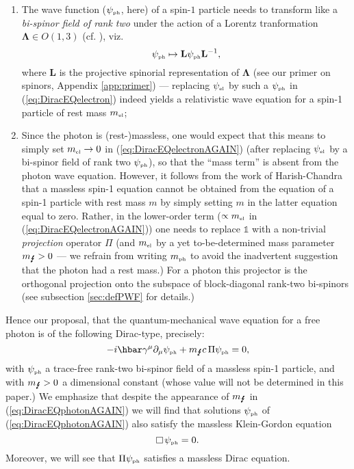 \documentclass[11pt]{article}
\theoremstyle{definition}
\newcommand{\refeq}[1]{(\ref{#1})}
\numberwithin{equation}{section}
\newcommand{\bL}{\mathbf{L}}
\newcommand{\beq}{\begin{equation}}
\newcommand{\eeq}{\end{equation}}
\newcommand{\Id}{\mathds{1}}
\newcommand{\bLa}{\boldsymbol{\Lambda}}
\newcommand{\psiPH}{{\psi_{\mbox{\rm\tiny ph}}}}
\newcommand{\psiEL}{{\psi_{\mbox{\rm\tiny el}}}}
\newcommand{\mEL}{{m_{\mbox{\rm\tiny el}}}}
\newcommand{\mPHO}{{m_{\mbox{\rm\tiny ph}}}}
\newcommand{\mPH}{{m_{\mbox{\Lightning}}}}
\newcommand{\ga}{\gamma}
\newcommand{\ben}{\begin{enumerate}}
\newcommand{\een}{\end{enumerate}}
\newcommand{\dal}{\raisebox{3pt}{\fbox{}}\,}
\begin{document}
\ben

\item 
{The wave function ($\psiPH$, here) of a spin-$1$ particle needs to transform like a {\em bi-spinor field of rank two}
under the action of a Lorentz tranformation $\bLa \in O(1,3)$ (cf. \cite{PenroseRindlerBOOK}), viz.
\beq 
\psiPH \mapsto \bL \psiPH \bL^{-1},
\eeq
where $\bL$ is the projective spinorial representation of $\bLa$ (see our primer on spinors, Appendix \ref{app:primer}) 
--- replacing $\psiEL$ by
such a $\psiPH$ in  \refeq{eq:DiracEQelectron} indeed yields a relativistic wave equation for a spin-1 particle of rest mass $\mEL$;}

\item
{Since the photon is (rest-)massless, one would expect that this means to simply set $\mEL\to 0$ 
in \refeq{eq:DiracEQelectronAGAIN} (after replacing $\psiEL$ by a {bi-spinor field of rank two} $\psiPH$),
so that the ``mass term'' is absent from the photon wave equation.
 However, it follows from the work of Harish-Chandra \cite{HC1946} that a massless spin-1 equation cannot be obtained 
from the equation of a  spin-1 particle with rest mass $m$ by simply setting $m$ in the latter equation equal to zero. 
 Rather, in the lower-order term ($\propto \mEL$ in \refeq{eq:DiracEQelectronAGAIN}) one
needs to replace $\Id$ with a non-trivial \emph{projection} operator $\Pi$ (and $\mEL$ by a yet to-be-determined mass parameter $\mPH>0$ ---
we refrain from writing $\mPHO$ to avoid the inadvertent suggestion that the photon had a rest mass.)
 For a photon this projector is the orthogonal projection onto the subspace of block-diagonal rank-two bi-spinors (see subsection 
\ref{sec:defPWF} for  details.)}

\een

\noindent
 Hence our proposal, that the quantum-mechanical wave equation for a free photon is of the following Dirac-type,
precisely:
\beq \label{eq:DiracEQphotonAGAIN} 
{-i\hbar \ga^\mu \partial_\mu \psiPH  + \mPH c\,\Pi \psiPH= 0},
\eeq
with $\psiPH$ a trace-free rank-two bi-spinor field of a massless spin-1 particle, and with $\mPH>0$ a dimensional constant (whose value will not be determined in this paper.)
 We emphasize that despite the appearance of $\mPH$ in (\ref{eq:DiracEQphotonAGAIN}) we will find
that solutions $\psiPH$ of \refeq{eq:DiracEQphotonAGAIN} also satisfy the massless Klein-Gordon equation 
\beq \label{eq:masslessKGeq}
\dal\psiPH=0.
\eeq
 Moreover, we will see that $\Pi\psiPH$ satisfies a massless Dirac equation. 
\end{document}
